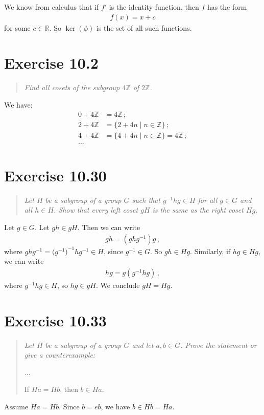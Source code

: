\documentclass{article}
\begin{document}
We know from calculus that if $f'$ is the identity function, then
$f$ has the form
\begin{align*}
    f(x) = x + c
\end{align*}
for some $c \in \mathbb{R}$. So $\ker(\phi)$ is the set of all such functions.

\section*{Exercise 10.2}

\begin{quote}
    \itshape
    Find all cosets of the subgroup $4\mathbb{Z}$ of $2\mathbb{Z}$.
\end{quote}

We have:
\begin{align*}
    0 + 4\mathbb{Z} &= 4 \mathbb{Z} \,; \\
    2 + 4\mathbb{Z} &= \bigl\{ 2 + 4n \;\vert\; n \in \mathbb{Z} \bigr\} \,; \\
    4 + 4\mathbb{Z} &= \bigl\{ 4 + 4n \;\vert\; n \in \mathbb{Z} \bigr\} = 4\mathbb{Z} \,; \\
    \dots
\end{align*}

\section*{Exercise 10.30}

\begin{quote}
    \itshape
    Let $H$ be a subgroup of a group $G$ such that $g^{-1}hg \in H$ for all
    $g \in G$ and all $h \in H$. Show that every left coset $gH$ is
    the same as the right coset $Hg$.
\end{quote}

Let $g \in G$. Let $gh \in gH$. Then we can write
\begin{align*}
    gh = (ghg^{-1}) g \,,
\end{align*}
where $ghg^{-1} = \bigl(g^{-1}\bigr)^{-1} h g^{-1} \in H$, since $g^{-1} \in G$.
So $gh \in Hg$. Similarly, if $hg \in Hg$, we can write
\begin{align*}
    hg = g(g^{-1}hg) \,,
\end{align*}
where $g^{-1} h g \in H$, so $hg \in gH$. We conclude $gH = Hg$. \qedsymbol

\section*{Exercise 10.33}

\begin{quote}
    \itshape
    Let $H$ be a subgroup of a group $G$ and let $a,b \in G$. Prove
    the statement or give a counterexample:

    ...

    If $Ha = Hb$, then $b \in Ha$.
\end{quote}

Assume $Ha = Hb$. Since $b = eb$, we have $b \in Hb = Ha$. \qedsymbol
\end{document}
